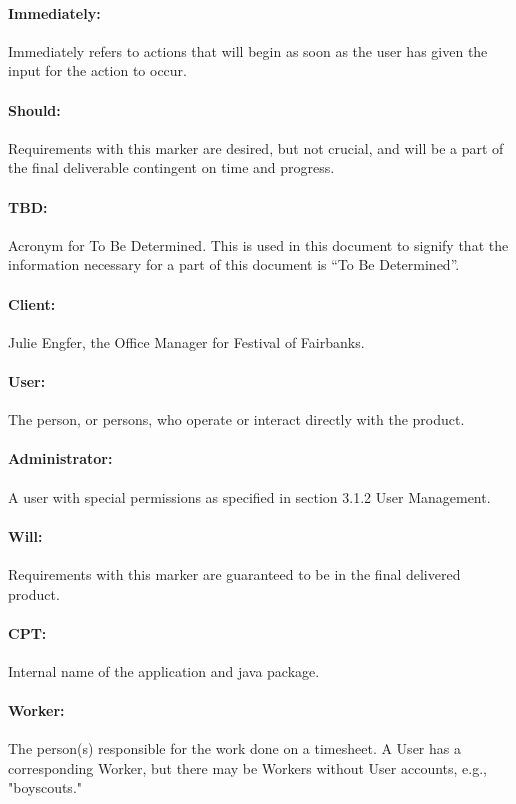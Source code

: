 \documentclass[12pt]{article}
\begin{document}
\paragraph{Immediately:} Immediately refers to actions that will begin as soon as the user has given the input for the action to occur.
\paragraph{Should:} Requirements with this marker are desired, but not crucial, and will be a part of the final deliverable contingent on time and progress.
\paragraph{TBD:} Acronym for To Be Determined. This is used in this document to signify that the information necessary for a part of this document is ``To Be Determined''.
\paragraph{Client:} Julie Engfer, the Office Manager for Festival of Fairbanks.
\paragraph{User:} The person, or persons, who operate or interact directly with the product.
\paragraph{Administrator:} A user with special permissions as specified in section 3.1.2 User Management.
\paragraph{Will:} Requirements with this marker are guaranteed to be in the final delivered product.
\paragraph{CPT:} Internal name of the application and java package.
\paragraph{Worker:} The person(s) responsible for the work done on a timesheet. A User has a corresponding Worker, but there may be Workers without User accounts, e.g., "boyscouts."
\end{document}
